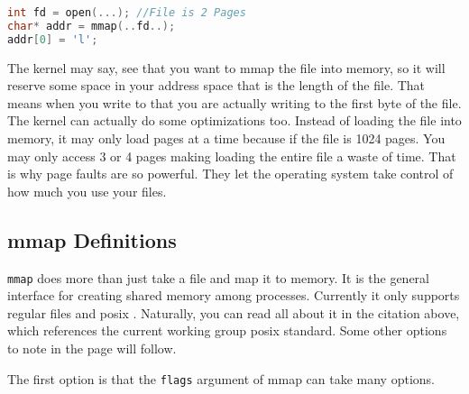 \begin{lstlisting}[language=C]
int fd = open(...); //File is 2 Pages
char* addr = mmap(..fd..);
addr[0] = 'l';
\end{lstlisting}

The kernel may say, see that you want to mmap the file into memory, so it will reserve some space in your address space that is the length of the file.
That means when you write to  that you are actually writing to the first byte of the file.
The kernel can actually do some optimizations too.
Instead of loading the file into memory, it may only load pages at a time because if the file is 1024 pages.
You may only access 3 or 4 pages making loading the entire file a waste of time.
That is why page faults are so powerful.
They let the operating system take control of how much you use your files.

\subsection{mmap Definitions}

\texttt{mmap} does more than just take a file and map it to memory.
It is the general interface for creating shared memory among processes.
Currently it only supports regular files and posix  \cite{mmap_2018}.
Naturally, you can read all about it in the citation above, which references the current working group posix standard.
Some other options to note in the page will follow.

The first option is that the \texttt{flags} argument of mmap can take many options.

